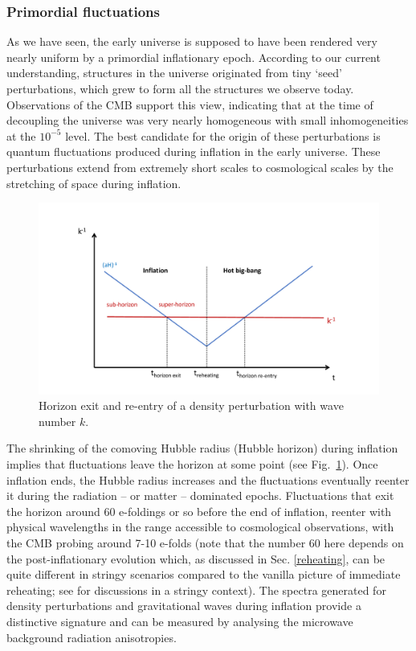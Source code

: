\subsubsection{Primordial fluctuations}\label{sec:PrimF}

As we have seen, the early universe is supposed to have been rendered very nearly uniform by a primordial inflationary epoch. According to our current understanding, structures in the universe originated from tiny `seed' perturbations, which grew to form  all the structures we observe today.
Observations of the CMB support this view, indicating that at the time of decoupling the universe was very nearly homogeneous with small inhomogeneities at the $10^{-5}$ level.
The best candidate for the origin of these perturbations is quantum fluctuations produced during  inflation  in the early universe.
 These perturbations extend from extremely short scales to cosmological scales by the stretching of space during inflation.
%
\begin{center}
\begin{figure}[H]
\includegraphics[width=14cm]{Sections/Figures/DensityPerturbations.pdf}
\caption{Horizon exit and re-entry of a density perturbation with wave number $k$.}
\label{Fig:perturbations}
\end{figure}
\end{center}
%
The shrinking of the comoving Hubble radius (Hubble horizon) during inflation implies that fluctuations leave the horizon at some point (see Fig.~\ref{Fig:perturbations}).  Once inflation  ends,  the Hubble radius increases and  the fluctuations eventually reenter it during the radiation -- or matter -- dominated epochs. Fluctuations that exit the horizon around 60 e-foldings or so before the end of inflation, reenter with physical wavelengths in the range accessible to cosmological observations, with the CMB probing around 7-10 e-folds (note that the number 60 here depends on the post-inflationary evolution which, as discussed in Sec. \ref{reheating}, can be quite different in stringy scenarios compared to the vanilla picture of immediate reheating; see \cite{Bhattacharya:2017ysa, Bhattacharya:2017pws} for discussions in a stringy context). The spectra generated for density perturbations and gravitational waves during inflation provide a distinctive signature and can be measured by analysing the microwave background radiation anisotropies.


